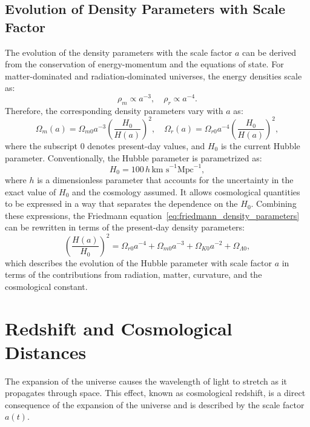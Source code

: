 \subsection{Evolution of Density Parameters with Scale Factor}
The evolution of the density parameters with the scale factor \( a \) can be derived from the conservation of energy-momentum and the equations of state. For matter-dominated and radiation-dominated universes, the energy densities scale as:
\begin{equation}
    \rho_m \propto a^{-3}, \quad \rho_r \propto a^{-4}.
    \label{eq:energy_density_scaling2}
\end{equation}
Therefore, the corresponding density parameters vary with \( a \) as:
\begin{equation}
    \Omega_m(a) = \Omega_{m0} a^{-3} \left( \frac{H_0}{H(a)} \right)^2, \quad \Omega_r(a) = \Omega_{r0} a^{-4} \left( \frac{H_0}{H(a)} \right)^2,
    \label{eq:density_parameters_evolution}
\end{equation}
where the subscript \( 0 \) denotes present-day values, and \( H_0 \) is the current Hubble parameter. Conventionally, the Hubble parameter is parametrized as:
\begin{equation}
    H_0 = 100 \, h \, \text{km s}^{-1} \text{Mpc}^{-1},
    \label{eq:hubble_parameter_current}
\end{equation}
where \( h \) is a dimensionless parameter that accounts for the uncertainty in the exact value of \( H_0 \) and the cosmology assumed. It allows cosmological quantities to be expressed in a way that separates the dependence on the $H_0$.
Combining these expressions, the Friedmann equation~\eqref{eq:friedmann_density_parameters} can be rewritten in terms of the present-day density parameters:
\begin{equation}
    \left( \frac{H(a)}{H_0} \right)^2 = \Omega_{r0} a^{-4} + \Omega_{m0} a^{-3} + \Omega_{K0} a^{-2} + \Omega_{\Lambda0},
    \label{eq:friedmann_rewritten}
\end{equation}
which describes the evolution of the Hubble parameter with scale factor \( a \) in terms of the contributions from radiation, matter, curvature, and the cosmological constant.

\section{Redshift and Cosmological Distances}
The expansion of the universe causes the wavelength of light to stretch as it propagates through space. This effect, known as cosmological redshift, is a direct consequence of the expansion of the universe and is described by the scale factor \( a(t) \). 

